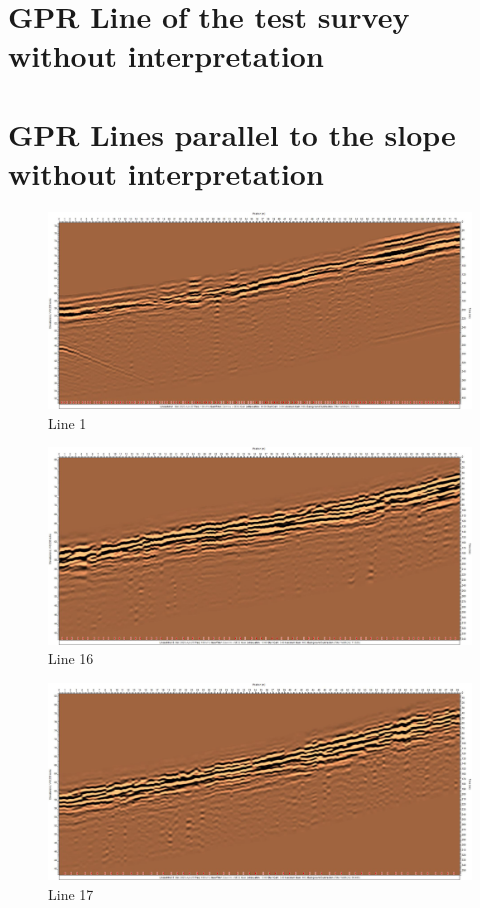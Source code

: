\appendix

\section{GPR Line of the test survey without interpretation}

\section{GPR Lines parallel to the slope without interpretation}

\begin{figure}[H]
    \centering
    \includegraphics[width=\linewidth]{Images/00_Results/line1.jpg}
    \caption{Line 1}
    \label{fig:line1_}
\end{figure}

\begin{figure}[H]
    \centering
    \includegraphics[width=\linewidth]{Images/00_Results/line16.jpg}
    \caption{Line 16}
    \label{fig:line16_}
\end{figure}

\begin{figure}[H]
    \centering
    \includegraphics[width=\linewidth]{Images/00_Results/line17.jpg}
    \caption{Line 17}
    \label{fig:line17_}
\end{figure}

